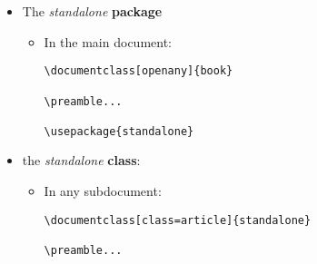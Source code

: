 \begin{itemize}
\item The \emph{standalone} \textbf{package}

\begin{itemize}
\item In the main document:
\begin{verbatim}
\documentclass[openany]{book}

\preamble...

\usepackage{standalone}
\end{verbatim}

\end{itemize}

\item the \emph{standalone} \textbf{class}:

\begin{itemize}
\item In any subdocument:
\begin{verbatim}
\documentclass[class=article]{standalone}

\preamble...
\end{verbatim}

\end{itemize}

\end{itemize}


